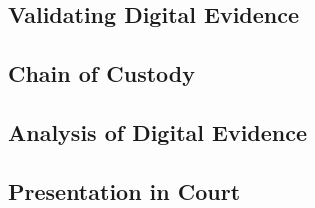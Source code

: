\subsection{Validating Digital Evidence}
\subsection{Chain of Custody}
\subsection{Analysis of Digital Evidence}
\subsection{Presentation in Court}
